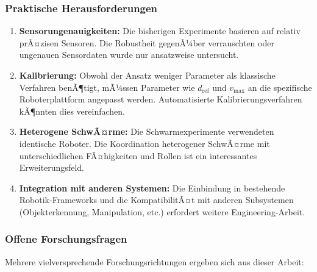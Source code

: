 ﻿\documentclass[a4paper,12pt]{article}
\theoremstyle{definition}
\begin{document}
\subsubsection{Praktische Herausforderungen}

\begin{enumerate}
	\item \textbf{Sensorungenauigkeiten:} Die bisherigen Experimente basieren auf relativ prÃ¤zisen Sensoren. Die Robustheit gegenÃ¼ber verrauschten oder ungenauen Sensordaten wurde nur ansatzweise untersucht.
	
	\item \textbf{Kalibrierung:} Obwohl der Ansatz weniger Parameter als klassische Verfahren benÃ¶tigt, mÃ¼ssen Parameter wie $d_{\text{ref}}$ und $v_{\text{max}}$ an die spezifische Roboterplattform angepasst werden. Automatisierte Kalibrierungsverfahren kÃ¶nnten dies vereinfachen.
	
	\item \textbf{Heterogene SchwÃ¤rme:} Die Schwarmexperimente verwendeten identische Roboter. Die Koordination heterogener SchwÃ¤rme mit unterschiedlichen FÃ¤higkeiten und Rollen ist ein interessantes Erweiterungsfeld.
	
	\item \textbf{Integration mit anderen Systemen:} Die Einbindung in bestehende Robotik-Frameworks und die KompatibilitÃ¤t mit anderen Subsystemen (Objekterkennung, Manipulation, etc.) erfordert weitere Engineering-Arbeit.
\end{enumerate}

\subsubsection{Offene Forschungsfragen}

Mehrere vielversprechende Forschungsrichtungen ergeben sich aus dieser Arbeit:
\end{document}

